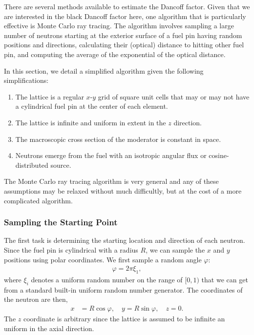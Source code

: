 There are several methods available to estimate the Dancoff factor. Given that we are interested in the black Dancoff factor here, one algorithm that is particularly effective is Monte Carlo ray tracing. The algorithm involves sampling a large number of neutrons starting at the exterior surface of a fuel pin having random positions and directions, calculating their (optical) distance to hitting other fuel pin, and computing the average of the exponential of the optical distance.

In this section, we detail a simplified algorithm given the following simplifications:
\begin{enumerate}
  \item The lattice is a regular $x$-$y$ grid of square unit cells that may or may not have a cylindrical fuel pin at the center of each element.
  \item The lattice is infinite and uniform in extent in the $z$ direction.
  \item The macroscopic cross section of the moderator is constant in space.
  \item Neutrons emerge from the fuel with an isotropic angular flux or cosine-distributed source.
\end{enumerate}
The Monte Carlo ray tracing algorithm is very general and any of these assumptions may be relaxed without much difficultly, but at the cost of a more complicated algorithm.

\subsubsection{Sampling the Starting Point}

The first task is determining the starting location and direction of each neutron. Since the fuel pin is cylindrical with a radius $R$, we can sample the $x$ and $y$ positions using polar coordinates. We first sample a random angle $\varphi$:
\begin{align}
  \varphi = 2\pi \xi_1,
\end{align}
where $\xi_i$ denotes a uniform random number on the range of $[0,1)$ that we can get from a standard built-in uniform random number generator. The coordinates of the neutron are then,
\begin{subequations}
\begin{align}
  x &= R \cos\varphi, \quad y = R \sin\varphi, \quad z = 0.
\end{align}
\end{subequations}
The $z$ coordinate is arbitrary since the lattice is assumed to be infinite an uniform in the axial direction.

